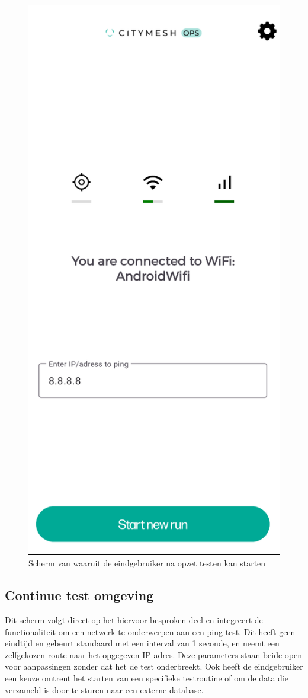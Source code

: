 \begin{figure}[!htb]
    \includegraphics[width=0.3\linewidth]{graphics/homescreen}
    \caption[Scherm van waaruit de eindgebruiker na opzet testen kan starten]{Scherm van waaruit de eindgebruiker na opzet testen kan starten}
    \label{fig:homescreen}
\end{figure}

\subsection{Continue test omgeving}

Dit scherm volgt direct op het hiervoor besproken deel en integreert de functionaliteit om een netwerk te onderwerpen aan een ping test. Dit heeft geen eindtijd en gebeurt standaard met een interval van 1 seconde, en neemt een zelfgekozen route naar het opgegeven IP adres. Deze parameters staan beide open voor aanpassingen zonder dat het de test onderbreekt. Ook heeft de eindgebruiker een keuze omtrent het starten van een specifieke testroutine of om de data die verzameld is door te sturen naar een externe database. 

